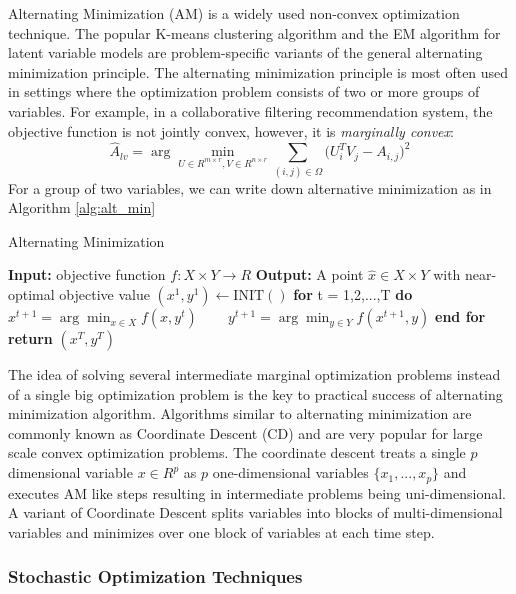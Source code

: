 Alternating Minimization (AM) is a widely used non-convex optimization technique. The popular K-means clustering algorithm and the EM algorithm for latent variable models are problem-specific variants of the general alternating minimization principle. The alternating minimization principle is most often used in settings where the optimization problem consists of two or more groups of variables. For example, in a collaborative filtering recommendation system, the objective function is not jointly convex, however, it is \textit{marginally convex}:
\begin{equation}
    \hat{A}_{lv} = \arg \min_{U \in R^{m\times r}, V \in R^{n\times r}} \sum_{(i,j)\in \Omega}\big(U_{i}^{T}V_{j} - A_{i,j}\big)^{2}
\end{equation}
For a group of two variables, we can write down alternative minimization as in Algorithm \ref{alg:alt_min}
\begin{algorithm}
\caption{Alternating Minimization}
\label{alg:alt_min}
\begin{algorithmic}[1]
\STATE \textbf{Input:} objective function $f: X \times Y \rightarrow R$
\STATE \textbf{Output:} A point $\hat{x} \in X \times Y$ with near-optimal objective value
\STATE $(x^{1}, y^{1}) \leftarrow \mathrm{INIT}()$
\STATE \textbf{for} t = 1,2,...,T \textbf{do}
\STATE ~~~ $x^{t+1} = \arg \min_{x \in X} f(x, y^t)$
\STATE ~~~ $y^{t+1} = \arg \min_{y \in Y} f(x^{t+1}, y)$
\STATE \textbf{end for}
\STATE \textbf{return} $(x^{T}, y^{T})$
\end{algorithmic}
\end{algorithm}

The idea of solving several intermediate marginal optimization problems instead of a single big optimization problem is the key to practical success of alternating minimization algorithm. Algorithms similar to alternating minimization are commonly known as Coordinate Descent (CD) and are very popular for large scale convex optimization problems. The coordinate descent treats a single $p$ dimensional variable $x \in R^{p}$ as $p$ one-dimensional variables $\{x_1,...,x_p\}$ and executes AM like steps resulting in intermediate problems being uni-dimensional. A variant of Coordinate Descent splits variables into blocks of multi-dimensional variables and minimizes over one block of variables at each time step. 

\subsubsection{Stochastic Optimization Techniques}

